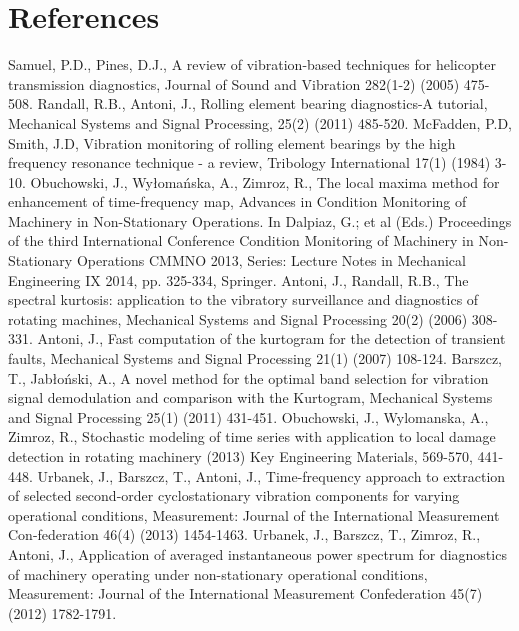 \documentclass[3p,times]{elsarticle}
\begin{document}
\section*{References}
\begin{thebibliography}{00}
	Samuel, P.D., Pines, D.J., A review of vibration-based techniques for helicopter transmission diagnostics, Journal of Sound and Vibration 282(1-2) (2005) 475-508. 
	Randall, R.B., Antoni, J., Rolling element bearing diagnostics-A tutorial, Mechanical Systems and Signal Processing, 25(2) (2011)  485-520.
 McFadden, P.D, Smith, J.D, Vibration monitoring of rolling element bearings by the high frequency resonance technique - a review, Tribology International 17(1) (1984) 3-10.
	Obuchowski, J., Wy{\l}oma{\'n}ska, A., Zimroz, R., The local maxima method for enhancement of time-frequency map, Advances in Condition Monitoring of Machinery in Non-Stationary Operations. In Dalpiaz, G.; et al (Eds.) Proceedings of the third International Conference Condition Monitoring of Machinery in Non-Stationary Operations CMMNO 2013, Series: Lecture Notes in Mechanical Engineering IX 2014,  pp. 325-334, Springer.
	Antoni, J., Randall, R.B., The spectral kurtosis: application to the vibratory surveillance and diagnostics of rotating machines, Mechanical Systems and Signal Processing 20(2) (2006) 308-331. 
	Antoni, J., Fast computation of the kurtogram for the detection of transient faults, Mechanical Systems and Signal Processing  21(1) (2007) 108-124.
	Barszcz, T., Jab{\l}o{\'n}ski, A.,  A novel method for the optimal band selection for vibration signal demodulation and comparison with the Kurtogram, Mechanical Systems and Signal Processing 25(1) (2011) 431-451.
	Obuchowski, J., Wylomanska, A., Zimroz, R., Stochastic modeling of time series with application to local damage detection in rotating machinery (2013) Key Engineering Materials, 569-570, 441-448.
	Urbanek, J., Barszcz, T., Antoni, J., Time-frequency approach to extraction of selected second-order cyclostationary vibration components for varying operational conditions, Measurement: Journal of the International Measurement Con-federation 46(4) (2013) 1454-1463.
	Urbanek, J., Barszcz, T., Zimroz, R., Antoni, J.,  Application of averaged instantaneous power spectrum for diagnostics of machinery operating under non-stationary operational conditions, Measurement: Journal of the International Measurement Confederation 45(7) (2012) 1782-1791.

\end{thebibliography}
\end{document}
